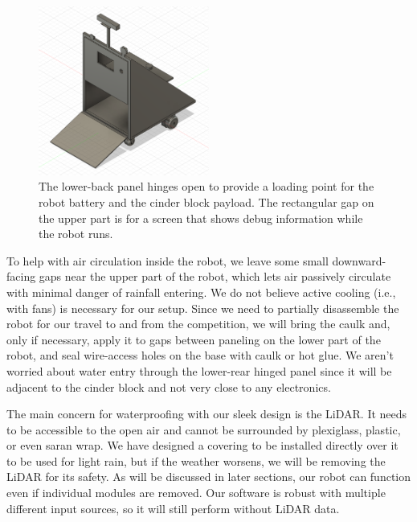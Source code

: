 \begin{figure}[h]
    \centering
    \includegraphics[width=0.5\textwidth]{images/frame/frame5.PNG}
    \caption{The lower-back panel hinges open to provide a loading point for the robot battery and the cinder block payload. The rectangular gap on the upper part is for a screen that shows debug information while the robot runs.}
\end{figure}

To help with air circulation inside the robot, we leave some small downward-facing gaps near the upper part of the robot, which lets air passively circulate with minimal danger of rainfall entering. We do not believe active cooling (i.e., with fans) is necessary for our setup. Since we need to partially disassemble the robot for our travel to and from the competition, we will bring the caulk and, only if necessary, apply it to gaps between paneling on the lower part of the robot, and seal wire-access holes on the base with caulk or hot glue. We aren't worried about water entry through the lower-rear hinged panel since it will be adjacent to the cinder block and not very close to any electronics. 

The main concern for waterproofing with our sleek design is the LiDAR. It needs to be accessible to the open air and cannot be surrounded by plexiglass, plastic, or even saran wrap. We have designed a covering to be installed directly over it to be used for light rain, but if the weather worsens, we will be removing the LiDAR for its safety. As will be discussed in later sections, our robot can function even if individual modules are removed. Our software is robust with multiple different input sources, so it will still perform without LiDAR data.